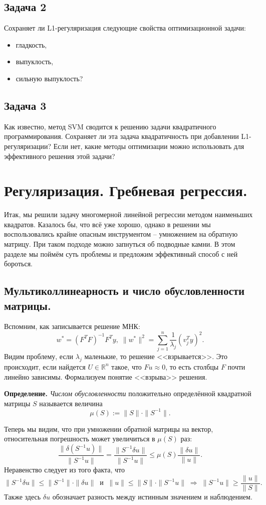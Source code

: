 \subsection*{Задача 2}
Сохраняет ли L1-регуляризация следующие свойства оптимизационной задачи:
\begin{itemize}
    \item гладкость,
    \item выпуклость,
    \item сильную выпуклость?
\end{itemize}

\subsection*{Задача 3}
Как известно, метод SVM сводится к решению задачи квадратичного программирования. Сохраняет ли эта задача квадратичность при добавлении L1-регуляризации? Если нет, какие методы оптимизации можно использовать для эффективного решения этой задачи?

\section*{Регуляризация. Гребневая регрессия.}

Итак, мы решили задачу многомерной линейной регрессии методом наименьших квадратов. Казалось бы, что всё уже хорошо, однако в решении мы воспользовались крайне опасным инструментом -- умножением на обратную матрицу. При таком подходе можно запнуться об подводные камни. В этом разделе мы поймём суть проблемы и предложим эффективный способ с ней бороться.

\subsection*{Мультиколлинеарность и число обусловленности матрицы.}
Вспомним, как записывается решение МНК:
$$w^* = (F^T F)^{-1} F^T y, \; \|w^*\|^2 = \sum_{j=1}^n \frac{1}{\lambda_j}(v_j^T y)^2.$$
Видим проблему, если $\lambda_j$ маленькие, то решение <<взрывается>>. Это происходит, если найдется $U \in \mathbb{R}^n$ такое, что $Fu \approx 0$, то есть столбцы $F$ почти линейно зависимы. Формализуем понятие <<взрыва>> решения.

\noindent\textbf{Определение.} \textit{Числом обусловленности} 
положительно определённой квадратной матрицы $S$ называется величина
$$\mu(S) := \|S\| \cdot \|S^{-1}\|.$$

Теперь мы видим, что при умножении обратной матрицы на вектор, относительная погрешность может увеличиться в $\mu(S)$ раз:
$$\frac{\|\delta(S^{-1}u)\|}{\|S^{-1}u\|} = \frac{\|S^{-1} \delta u\|}{\|S^{-1}u\|} \leqslant \mu(S)\frac{\|\delta u\|}{\|u\|}.$$
Неравенство следует из того факта, что
$$\|S^{-1}\delta u\| \leqslant \|S^{-1}\| \cdot \|\delta u\| \;\; \text{и} \;\; \|u\| \leqslant \|S\| \cdot \|S^{-1}u\| \; \Rightarrow \; \|S^{-1}u\| \geqslant \frac{\|u\|}{\|S\|}.$$
Также здесь $\delta u$ обозначает разность между истинным значением и наблюдением.

